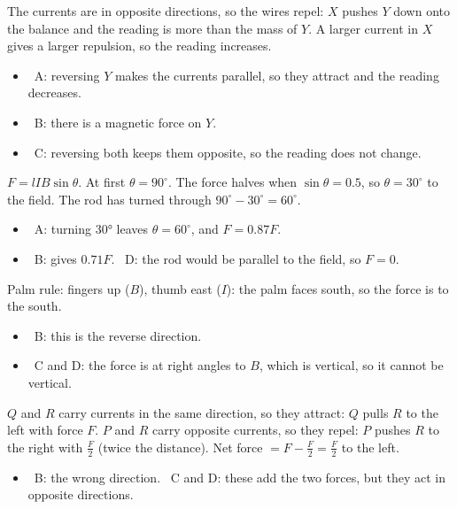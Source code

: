 \documentclass[12pt]{article}
\begin{document}
\begin{practiceanswers}
\begin{practiceans}
  The currents are in opposite directions, so the wires repel: $X$ pushes $Y$ down onto the balance and
  the reading is more than the mass of $Y$. A larger current in $X$ gives a larger repulsion, so the
  reading increases.
  \begin{itemize}
    \item \xmark\ A: reversing $Y$ makes the currents parallel, so they attract and the reading decreases.
    \item \xmark\ B: there is a magnetic force on $Y$.
    \item \xmark\ C: reversing both keeps them opposite, so the reading does not change.
  \end{itemize}
\end{practiceans}

\begin{practiceans}
  $F = lIB\sin\theta$. At first $\theta = 90^\circ$. The force halves when $\sin\theta = 0.5$, so
  $\theta = 30^\circ$ to the field. The rod has turned through $90^\circ - 30^\circ = 60^\circ$.
  \begin{itemize}
    \item \xmark\ A: turning \ang{30} leaves $\theta = 60^\circ$, and $F = 0.87F$.
    \item \xmark\ B: gives $0.71F$. \quad \xmark\ D: the rod would be parallel to the field, so $F = 0$.
  \end{itemize}
\end{practiceans}

\begin{practiceans}
  Palm rule: fingers up ($B$), thumb east ($I$): the palm faces south, so the force is to the south.
  \begin{itemize}
    \item \xmark\ B: this is the reverse direction.
    \item \xmark\ C and D: the force is at right angles to $B$, which is vertical, so it cannot be vertical.
  \end{itemize}
\end{practiceans}

\begin{practiceans}
  $Q$ and $R$ carry currents in the same direction, so they attract: $Q$ pulls $R$ to the left with force
  $F$. $P$ and $R$ carry opposite currents, so they repel: $P$ pushes $R$ to the right with $\frac{F}{2}$
  (twice the distance). Net force $= F - \frac{F}{2} = \frac{F}{2}$ to the left.
  \begin{itemize}
    \item \xmark\ B: the wrong direction. \quad \xmark\ C and D: these add the two forces, but they act
          in opposite directions.
  \end{itemize}
\end{practiceans}


\end{practiceanswers}
\end{document}
